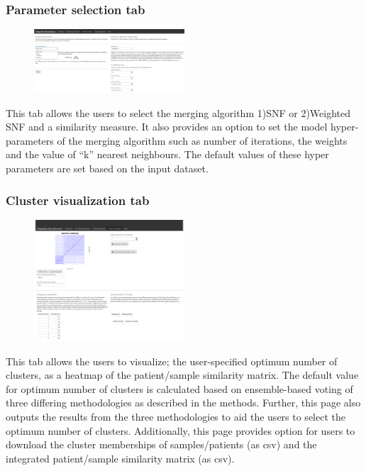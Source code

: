 \subsubsection{Parameter selection tab}
\begin{figure}[H]
	\centering
\includegraphics[width=0.5\textwidth]{image/parameter_sel-tab.png}
\end{figure}
This tab allows the users to select the merging algorithm 1)SNF or 2)Weighted SNF and a similarity measure. It also provides an option to set the model hyper-parameters of the merging algorithm such as number of iterations, the weights and the value of “k” nearest neighbours. The default values of these hyper parameters are set based on the input dataset.
\subsubsection{Cluster visualization tab}
\begin{figure}[H]
	\centering
\includegraphics[width=0.5\textwidth]{image/cluster_vis-tab.png}
\end{figure}
This tab allows the users to visualize; the user-specified optimum number of clusters, as a heatmap of the patient/sample similarity matrix. The default value for optimum number of clusters is calculated based on ensemble-based voting of three differing methodologies as described in the methods. Further, this page also outputs the results from the three methodologies to aid the users to  select the optimum number of clusters. Additionally, this page provides option for users to download the cluster memberships of samples/patients (as csv) and the integrated patient/sample similarity matrix (as csv).
